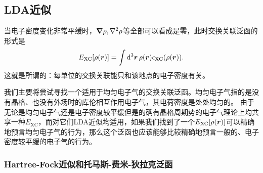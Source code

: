 \subsection{LDA近似}

当电子密度变化非常平缓时，$\grad{\rho},\laplacian{\rho}$等全部可以看成是零，此时交换关联泛函的形式是
\begin{equation}
    E_\text{XC}[\rho(\vb*{r})] = \int \dd[3]{\vb*{r}} \rho(\vb*{r}) \epsilon_\text{XC}(\rho(\vb*{r})).
\end{equation}
这就是所谓的：每单位的交换关联能只和该地点的电子密度有关。

我们主要将尝试寻找一个适用于均匀电子气的交换关联泛函。均匀电子气指的是没有晶格、也没有外场时的库伦相互作用电子气，其电荷密度是处处均匀的。
由于无论是均匀电子气还是电子密度较平缓但是的确有晶格周期势的电子气理论上均共享一种$E_\text{XC}$，而对它们LDA近似均适用，如果我们找到了一个$E_\text{XC}[\rho(\vb*{r})]$可以精确地预言均匀电子气的行为，那么这个泛函也应该能够比较精确地预言一般的、电子密度较平缓的电子气的行为。

\subsubsection{Hartree-Fock近似和托马斯-费米-狄拉克泛函}

